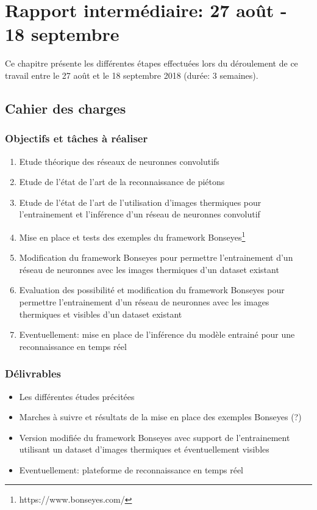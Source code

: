 \chapter{Rapport intermédiaire: 27 août - 18 septembre}
Ce chapitre présente les différentes étapes effectuées lors du déroulement de ce travail entre le 27 août et le 18 septembre 2018 (durée: 3 semaines).

\section{Cahier des charges}

\subsection{Objectifs et tâches à réaliser}
\begin{enumerate}
	\item Etude théorique des réseaux de neuronnes convolutifs
	\item Etude de l'état de l'art de la reconnaissance de piétons
	\item Etude de l'état de l'art de l'utilisation d'images thermiques pour l'entrainement et l'inférence d'un réseau de neuronnes convolutif
	\item Mise en place et tests des exemples du framework Bonseyes\footnote{https://www.bonseyes.com/}
	\item Modification du framework Bonseyes pour permettre l'entrainement d'un réseau de neuronnes avec les images thermiques d'un dataset existant
	\item Evaluation des possibilité et modification du framework Bonseyes pour permettre l'entrainement d'un réseau de neuronnes avec les images thermiques et visibles d'un dataset existant
	\item Eventuellement: mise en place de l'inférence du modèle entrainé pour une reconnaissance en temps réel


\end{enumerate}

\subsection{Délivrables}
\begin{itemize}
	\item Les différentes études précitées
	\item Marches à suivre et résultats de la mise en place des exemples Bonseyes (?)
	\item Version modifiée du framework Bonseyes avec support de l'entrainement utilisant un dataset d'images thermiques et éventuellement visibles
	\item Eventuellement: plateforme de reconnaissance en temps réel
\end{itemize}

